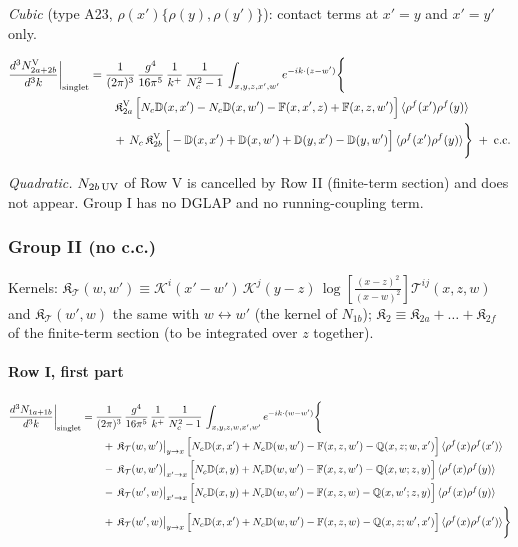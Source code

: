 \documentclass[10pt]{article}
\def\mf#1{\mathbb{#1}}
\begin{document}
\emph{Cubic} (type A23, $\rho(x')\{\rho(y),\rho(y')\}$): contact terms at $x'=y$ and $x'=y'$ only.

\begin{align}
\frac{d^{3}N_{2a+2b}^{\rm V}}{d^{3}k}\bigg|_{\rm singlet}&=\frac{1}{(2\pi)^{3}}\,\frac{g^{4}}{16\pi^{5}}\,\frac{1}{k^{+}}\,\frac{1}{N_{c}^{2}-1}\,\int_{x,y,z,x',w'}e^{-ik\cdot(z-w')}\Bigg\{\notag\\
&\qquad \,\mathfrak{K}^{\rm V}_{2a}\,\Big[N_{c}\mf{D}(x,x')-N_{c}\mf{D}(x,w')-\mf{F}(x,x',z)+\mf{F}(x,z,w')\Big]\,\langle\rho^{f}(x')\rho^{f}(y)\rangle\notag\\
&\qquad +\,N_{c}\,\mathfrak{K}^{\rm V}_{2b}\,\Big[-\mf{D}(x,x')+\mf{D}(x,w')+\mf{D}(y,x')-\mf{D}(y,w')\Big]\,\langle\rho^{f}(x')\rho^{f}(y)\rangle\Bigg\}\;+\;{\rm c.c.}\label{eq:s-I-V-2}
\end{align}

\emph{Quadratic.} $N_{2b\,\rm UV}$ of Row V is cancelled by Row II (finite-term section) and does not appear. Group I has no DGLAP and no running-coupling term.

\subsubsection{Group II (no c.c.)}
\noindent Kernels: $\mathfrak{K}_{\mathcal{T}}(w,w')\equiv\mathcal{K}^{i}(x'-w')\,\mathcal{K}^{j}(y-z)\,\log\left[\frac{(x-z)^{2}}{(x-w)^{2}}\right]\mathcal{T}^{ij}(x,z,w)$ and $\mathfrak{K}_{\mathcal{T}}(w',w)$ the same with $w\leftrightarrow w'$ (the kernel of $N_{1b}$); $\mathfrak{K}_{2}\equiv\mathfrak{K}_{2a}+\dots+\mathfrak{K}_{2f}$ of the finite-term section (to be integrated over $z$ together).
\paragraph*{Row I, first part}

\begin{align}
\frac{d^{3}N_{1a+1b}}{d^{3}k}\bigg|_{\rm singlet}&=\frac{1}{(2\pi)^{3}}\,\frac{g^{4}}{16\pi^{5}}\,\frac{1}{k^{+}}\,\frac{1}{N_{c}^{2}-1}\,\int_{x,y,z,w,x',w'}e^{-ik\cdot(w-w')}\Bigg\{\notag\\
&\qquad +\,\mathfrak{K}_{\mathcal{T}}(w,w')\big|_{y\to x}\,\Big[N_{c}\mf{D}(x,x')+N_{c}\mf{D}(w,w')-\mf{F}(x,z,w')-\mf{Q}(x,z;w,x')\Big]\,\langle\rho^{f}(x)\rho^{f}(x')\rangle\notag\\
&\qquad -\,\mathfrak{K}_{\mathcal{T}}(w,w')\big|_{x'\to x}\,\Big[N_{c}\mf{D}(x,y)+N_{c}\mf{D}(w,w')-\mf{F}(x,z,w')-\mf{Q}(x,w;z,y)\Big]\,\langle\rho^{f}(x)\rho^{f}(y)\rangle\notag\\
&\qquad -\,\mathfrak{K}_{\mathcal{T}}(w',w)\big|_{x'\to x}\,\Big[N_{c}\mf{D}(x,y)+N_{c}\mf{D}(w,w')-\mf{F}(x,z,w)-\mf{Q}(x,w';z,y)\Big]\,\langle\rho^{f}(x)\rho^{f}(y)\rangle\notag\\
&\qquad +\,\mathfrak{K}_{\mathcal{T}}(w',w)\big|_{y\to x}\,\Big[N_{c}\mf{D}(x,x')+N_{c}\mf{D}(w,w')-\mf{F}(x,z,w)-\mf{Q}(x,z;w',x')\Big]\,\langle\rho^{f}(x)\rho^{f}(x')\rangle\Bigg\}\label{eq:s-II-I-1}
\end{align}
\end{document}
